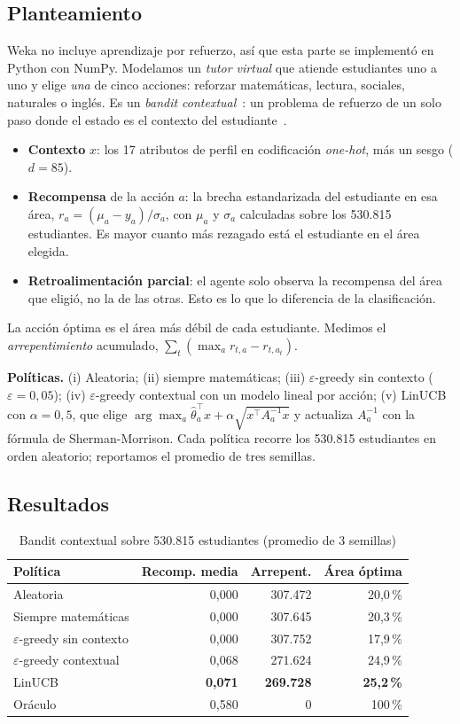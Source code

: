 \documentclass[conference]{IEEEtran}
\begin{document}
\subsection{Planteamiento}
Weka no incluye aprendizaje por refuerzo, así que esta parte se implementó en Python con NumPy. Modelamos un \emph{tutor virtual} que atiende estudiantes uno a uno y elige \emph{una} de cinco acciones: reforzar matemáticas, lectura, sociales, naturales o inglés. Es un \emph{bandit contextual}~\cite{li2010}: un problema de refuerzo de un solo paso donde el estado es el contexto del estudiante~\cite{sutton}.
\begin{itemize}
\item \textbf{Contexto} $x$: los 17 atributos de perfil en codificación \emph{one-hot}, más un sesgo ($d=85$).
\item \textbf{Recompensa} de la acción $a$: la brecha estandarizada del estudiante en esa área, $r_a=(\mu_a - y_a)/\sigma_a$, con $\mu_a$ y $\sigma_a$ calculadas sobre los 530.815 estudiantes. Es mayor cuanto más rezagado está el estudiante en el área elegida.
\item \textbf{Retroalimentación parcial}: el agente solo observa la recompensa del área que eligió, no la de las otras. Esto es lo que lo diferencia de la clasificación.
\end{itemize}
La acción óptima es el área más débil de cada estudiante. Medimos el \emph{arrepentimiento} acumulado, $\sum_t (\max_a r_{t,a} - r_{t,a_t})$.

\textbf{Políticas.} (i) Aleatoria; (ii) siempre matemáticas; (iii) $\varepsilon$-greedy sin contexto ($\varepsilon=0{,}05$); (iv) $\varepsilon$-greedy contextual con un modelo lineal por acción; (v) LinUCB~\cite{li2010} con $\alpha=0{,}5$, que elige $\arg\max_a \hat\theta_a^\top x + \alpha\sqrt{x^\top A_a^{-1}x}$ y actualiza $A_a^{-1}$ con la fórmula de Sherman-Morrison. Cada política recorre los 530.815 estudiantes en orden aleatorio; reportamos el promedio de tres semillas.

\subsection{Resultados}
\begin{table}[t]
\caption{Bandit contextual sobre 530.815 estudiantes (promedio de 3 semillas)}
\label{tab:bandit}
\centering\small\setlength{\tabcolsep}{4pt}
\begin{tabular}{lrrr}
\toprule
Política & Recomp. media & Arrepent. & Área óptima \\
\midrule
Aleatoria & 0,000 & 307.472 & 20,0\,\% \\
Siempre matemáticas & 0,000 & 307.645 & 20,3\,\% \\
$\varepsilon$-greedy sin contexto & 0,000 & 307.752 & 17,9\,\% \\
$\varepsilon$-greedy contextual & 0,068 & 271.624 & 24,9\,\% \\
LinUCB & \textbf{0,071} & \textbf{269.728} & \textbf{25,2\,\%} \\
Oráculo & 0,580 & 0 & 100\,\% \\
\bottomrule
\end{tabular}
\end{table}
\end{document}
